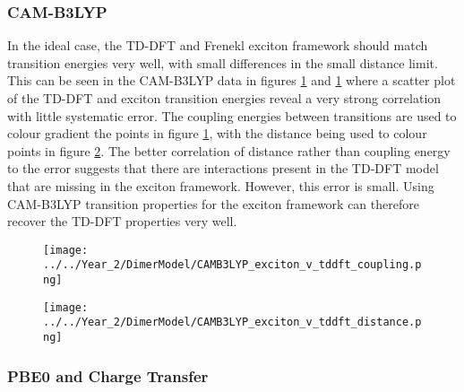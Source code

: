 \subsubsection{CAM-B3LYP}
\label{subsubsec:camb3lyp_excitons}

In the ideal case, the TD-DFT and Frenekl exciton framework should match transition
energies very well, with small differences in the small distance limit. This can
be seen in the CAM-B3LYP data in figures \ref{fig:camb3lyp_tddft_exciton_coupling}
and \ref{fig:camb3lyp_tddft_exciton_coupling} where a scatter plot of the TD-DFT
and exciton transition energies reveal a very strong correlation with little systematic
error. The coupling energies between transitions are used to colour gradient the
points in figure \ref{fig:camb3lyp_tddft_exciton_coupling}, with the distance being
used to colour points in figure \ref{fig:camb3lyp_tddft_exciton_distances}. The
better correlation of distance rather than coupling energy to the error suggests
that there are interactions present in the TD-DFT model that are missing in the
exciton framework. However, this error is small. Using CAM-B3LYP transition properties
for the exciton framework can therefore recover the TD-DFT properties very well.

\begin{figure}
    \centering
    \texttt{[image: ../../Year\_2/DimerModel/CAMB3LYP\_exciton\_v\_tddft\_coupling.png]}
    \label{fig:camb3lyp_tddft_exciton_coupling}
\end{figure}

\begin{figure}
    \centering
    \texttt{[image: ../../Year\_2/DimerModel/CAMB3LYP\_exciton\_v\_tddft\_distance.png]}
    \label{fig:camb3lyp_tddft_exciton_distances}
\end{figure}

\afterpartskip
\subsubsection{PBE0 and Charge Transfer}
\label{subsubsec:pbe0_excitons}

